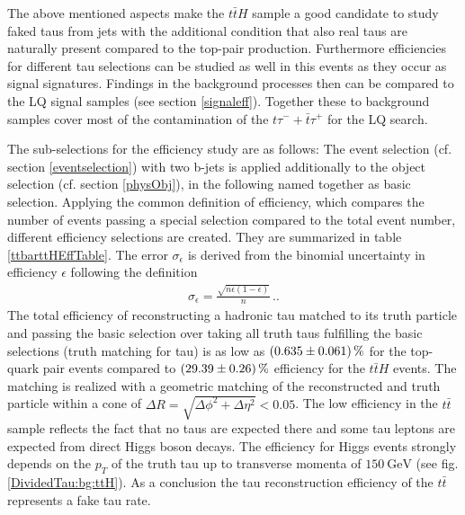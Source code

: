 %
The above mentioned aspects make the $t\bar{t}H$ sample a good candidate to study faked taus from jets with the additional condition that also real taus are naturally present compared to the top-pair production. Furthermore efficiencies for different tau selections can be studied as well in this events as they occur as signal signatures. Findings in the background processes then can be compared to the LQ signal samples (see section \ref{signaleff}). \newline
Together these to background samples cover most of the contamination of the $t\tau^{-}+\bar{t}\tau^{+}$ for the LQ search.\par
The sub-selections for the efficiency study are as follows: The event selection (cf. section \ref{eventselection}) with two b-jets is applied additionally to the object selection (cf. section \ref{physObj}), in the following named together as basic selection. Applying the common definition of efficiency, which compares the number of events passing a special selection compared to the total event number, different efficiency selections are created. They are summarized in table \ref{ttbarttHEffTable}. The error $\sigma_\epsilon$ is derived from the binomial uncertainty in efficiency $\epsilon$ following the definition
\begin{align}
\sigma_\epsilon=\frac{\sqrt{n\epsilon\left(1-\epsilon\right)}}{n}\,\text{.}.
\label{binomialerror}
\end{align}
The total efficiency of reconstructing a hadronic tau matched to its truth particle and passing the basic selection over taking all truth taus fulfilling the basic selections (truth matching for tau) is as low as $\SI{0.635\pm 0.061}{\percent}$ for the top-quark pair events compared to $\SI{29.39\pm 0.26}{\percent}$ efficiency for the $t\bar{t}H$ events. The matching is realized with a geometric matching of the reconstructed and truth particle within a cone of $\Delta R=\sqrt{\Delta\phi^2+\Delta\eta^2}<0.05$. The low efficiency in the $t\bar{t}$ sample reflects the fact that no taus are expected there and some tau leptons are expected from direct Higgs boson decays. The efficiency for Higgs events strongly depends on the $p_T$ of the truth tau up to transverse momenta of $\SI{150}{\giga\electronvolt}$ (see fig. \ref{DividedTau:bg:ttH}). As a conclusion the tau reconstruction efficiency of the $t\bar{t}$ represents a fake tau rate.\par 
%	
